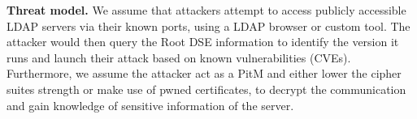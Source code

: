 
\textbf{Threat model.} We assume that attackers attempt to access publicly accessible \gls{LDAP} servers via their known ports, using a \gls{LDAP} browser or custom tool. The attacker would then query the Root DSE information to identify the version it runs and launch their attack based on known vulnerabilities (CVEs). Furthermore, we assume the attacker act as a \gls{PitM} and either lower the cipher suites strength or make use of pwned certificates, to decrypt the communication and gain knowledge of sensitive information of the server.
\fi  




